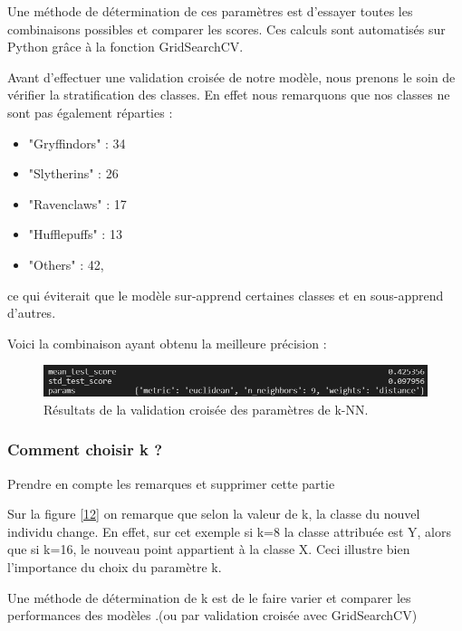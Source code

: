 \documentclass[11pt]{article}
\begin{document}
Une méthode de détermination de ces paramètres est d'essayer toutes les combinaisons possibles et comparer les scores. Ces calculs sont automatisés sur Python grâce à la fonction GridSearchCV. 

Avant d'effectuer une validation croisée de notre modèle, nous prenons le soin de vérifier la stratification des classes. En effet nous remarquons que nos classes ne sont pas également réparties : 

    \begin{itemize}
        \item "Gryffindors" : 34
        \item "Slytherins" : 26
        \item "Ravenclaws" : 17
        \item "Hufflepuffs" : 13
        \item "Others" : 42,
    \end{itemize}

ce qui éviterait que le modèle sur-apprend certaines classes et en sous-apprend d'autres.\par
Voici la combinaison ayant obtenu la meilleure précision :

\begin{figure}[hbt!]
    \centering
    \includegraphics[width = 14 cm]{./figures/kNN_CV.png}
    \caption{Résultats de la validation croisée des paramètres de k-NN.}
    \label{kNN_CV}
\end{figure}
\FloatBarrier



\subsubsection{Comment choisir k ?}

Prendre en compte les remarques et supprimer cette partie

Sur la figure \autoref{12} on remarque que selon la valeur de k, la classe du nouvel individu change. En effet, sur cet exemple si k=8 la classe attribuée est Y, alors que si k=16, le nouveau point appartient à la classe X. Ceci illustre bien l'importance du choix du paramètre k.\par
Une méthode de détermination de k est de le faire varier et comparer les performances des modèles .(ou par validation croisée avec GridSearchCV)\par
\end{document}

